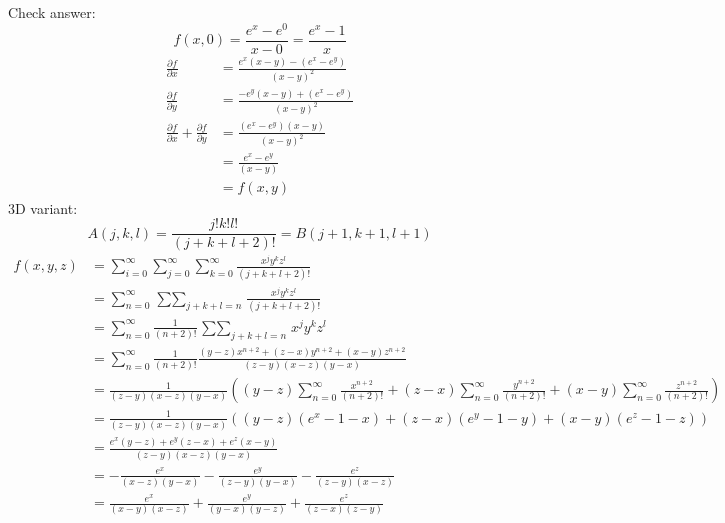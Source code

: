 \documentclass{article}
\begin{document}
Check answer:
\[f(x, 0) = \frac{e^x-e^0}{x-0} = \frac{e^x-1}{x}\]
\begin{align*}
  \frac{\partial f}{\partial x} &= \frac{e^x(x-y)-(e^x-e^y)}{(x-y)^2} \\
  \frac{\partial f}{\partial y} &= \frac{-e^y(x-y)+(e^x-e^y)}{(x-y)^2} \\
  \frac{\partial f}{\partial x}+\frac{\partial f}{\partial y} &= \frac{(e^x-e^y)(x-y)}{(x-y)^2} \\
  &= \frac{e^x-e^y}{(x-y)} \\
  &= f(x, y)
\end{align*}
\newpage
3D variant:
\[A(j, k, l) = \frac{j!k!l!}{(j+k+l+2)!} = B(j+1, k+1, l+1)\]
\begin{align*}
  f(x, y, z) &= \sum_{i=0}^\infty\sum_{j=0}^\infty\sum_{k=0}^\infty\frac{x^jy^kz^l}{(j+k+l+2)!} \\
  &= \sum_{n=0}^\infty\mathop{\sum\sum}_{j+k+l=n}\frac{x^jy^kz^l}{(j+k+l+2)!} \\
  &= \sum_{n=0}^\infty\frac{1}{(n+2)!}\mathop{\sum\sum}_{j+k+l=n}x^jy^kz^l \\
  &= \sum_{n=0}^\infty\frac{1}{(n+2)!}\frac{(y-z)x^{n+2}+(z-x)y^{n+2}+(x-y)z^{n+2}}{(z-y)(x-z)(y-x)} \\
  &= \frac{1}{(z-y)(x-z)(y-x)}\left(
  (y-z)\sum_{n=0}^\infty\frac{x^{n+2}}{(n+2)!} +
  (z-x)\sum_{n=0}^\infty\frac{y^{n+2}}{(n+2)!} +
  (x-y)\sum_{n=0}^\infty\frac{z^{n+2}}{(n+2)!}
  \right) \\
  &= \frac{1}{(z-y)(x-z)(y-x)}((y-z)(e^x-1-x)+(z-x)(e^y-1-y)+(x-y)(e^z-1-z)) \\
  &= \frac{e^x(y-z)+e^y(z-x)+e^z(x-y)}{(z-y)(x-z)(y-x)} \\
  &= -\frac{e^x}{(x-z)(y-x)}-\frac{e^y}{(z-y)(y-x)}-\frac{e^z}{(z-y)(x-z)} \\
  &= \frac{e^x}{(x-y)(x-z)}+\frac{e^y}{(y-x)(y-z)}+\frac{e^z}{(z-x)(z-y)}
\end{align*}
\end{document}
